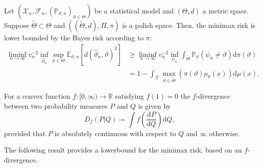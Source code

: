 \documentclass[a4paper]{article}
\begin{document}
\begin{propositionrep}
Let $(\mathcal{X}_n, \mathcal{F}_n, (\mathbb{P}_{\vartheta,n})_{\vartheta \in \Theta})$ be a statistical model and $(\Theta,d)$ a metric space. Suppose $\tilde{\Theta}\subset \Theta$ and $((\tilde{\Theta},d), \Pi, \pi)$ is a polish space. Then, the minimax risk is lower bounded by the Bayes risk according to $\pi$:
\begin{equation*}
\begin{aligned}
\liminf_{n \rightarrow \infty} v_n^{-2} \inf_{\hat{\vartheta}_n} \sup_{\vartheta \in \Theta} \mathbb{E}_{\vartheta,n}[d(\hat{\vartheta}_{n}, \vartheta)^{2}] &\geq \liminf_{n \rightarrow \infty} v_n^{-2} \inf_{\psi_n} \int_{\tilde{\Theta}} \mathbb{P}_{\vartheta}(\psi_n \neq \vartheta) \mathrm{d}\pi(\vartheta)\\
&=1-\int_{\mathcal{X}}\max_{\vartheta \in \tilde{\Theta}} (\pi(\vartheta)p_{\vartheta}(x))\mathrm{d}\mu(x). 
\end{aligned}
\end{equation*}
\end{propositionrep}
\begin{definition}
For a convex function $f:[0,\infty) \rightarrow \mathbb{R}$ satisfying $f(1)=0$ the $f$-divergence between two probability measures $P$ and $Q$ is given by
\begin{equation*}
D_f(P | Q) \coloneqq \int f \left(\frac{\mathrm{d}P}{\mathrm{d}Q}\right)\mathrm{d}Q,
\end{equation*}
provided that $P$ is absolutely continuous with respect to $Q$ and $\infty$ otherwise. 
\end{definition}
The following result provides a lowerbound for the minimax risk, based on an $f$-divergence.
\begin{proposition}

\end{proposition}






\end{document}
